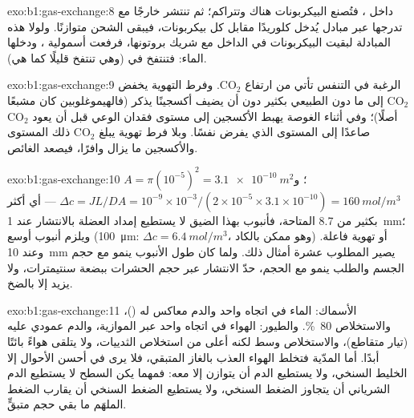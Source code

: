 \begin{solution}{exo:b1:gas-exchange:8}
 داخل ، فتُصنع البيكربونات هناك وتتراكم؛
ثم تنتشر خارجًا مع تدرجها عبر مبادل يُدخل كلوريدًا مقابل كل
بيكربونات، فيبقى الشحن متوازنًا. ولولا هذه المبادلة لبقيت
البيكربونات في الداخل مع شريك بروتونها، فرفعت أسمولية ،
ودخلها الماء: فتنتفخ  في  (وهي تنتفخ قليلًا كما هي).
\end{solution}

\begin{solution}{exo:b1:gas-exchange:9}
الرغبة في التنفس تأتي من ارتفاع $\mathrm{CO_2}$. وفرط التهوية يخفض
$\mathrm{CO_2}$ إلى ما دون الطبيعي بكثير دون أن يضيف أكسجينًا يذكر
(فالهيموغلوبين كان مشبعًا أصلًا)؛ وفي أثناء الغوصة يهبط الأكسجين
إلى مستوى فقدان الوعي قبل أن يعود $\mathrm{CO_2}$ صاعدًا إلى
المستوى الذي يفرض نفسًا. وبلا فرط تهوية يبلغ $\mathrm{CO_2}$ ذلك
المستوى والأكسجين ما يزال وافرًا، فيصعد الغائص.
\end{solution}

\begin{solution}{exo:b1:gas-exchange:10}
$A = \pi(10^{-5})^2 = \qty{3.1e-10}{m^2}$؛ و$\Delta c = JL/DA =
10^{-9}\times 10^{-3}/(2\times 10^{-5}\times 3.1\times 10^{-10}) =
\qty{160}{mol/m^3}$ --- أي أكثر بكثير من \qty{8.7}{} المتاحة، فأنبوب
بهذا الضيق لا يستطيع إمداد العضلة بالانتشار عند \qty{1}{mm}؛
ويلزم أنبوب أوسع (\qty{100}{\micro m}: $\Delta c = \qty{6.4}{mol/m^3}$، وهو
ممكن بالكاد) أو تهوية فاعلة. وعند \qty{10}{mm} يصير المطلوب عشرة
أمثال ذلك. ولما كان طول الأنبوب ينمو مع حجم الجسم والطلب ينمو مع
الحجم، حدّ الانتشار عبر  حجم الحشرات ببضعة
سنتيمترات، ولا يزيد إلا بالضخ.
\end{solution}

\begin{solution}{exo:b1:gas-exchange:11}
الأسماك: الماء في اتجاه واحد والدم معاكس له ()،
والاستخلاص \qty{80}{\%}. والطيور: الهواء في اتجاه واحد عبر
 الموازية، والدم عمودي عليه (تيار متقاطع)، والاستخلاص
وسط لكنه أعلى من استخلاص الثدييات، ولا يتلقى  هواءً
بائتًا أبدًا. أما  المدّية فتخلط الهواء العذب بالغاز
المتبقي، فلا يرى  في أحسن الأحوال إلا الخليط السنخي،
ولا يستطيع الدم أن يتوازن إلا معه: فمهما يكن السطح لا يستطيع الدم
الشرياني أن يتجاوز الضغط السنخي، ولا يستطيع الضغط السنخي أن يقارب
الضغط الملهَم ما بقي حجم متبقٍّ.
\end{solution}

